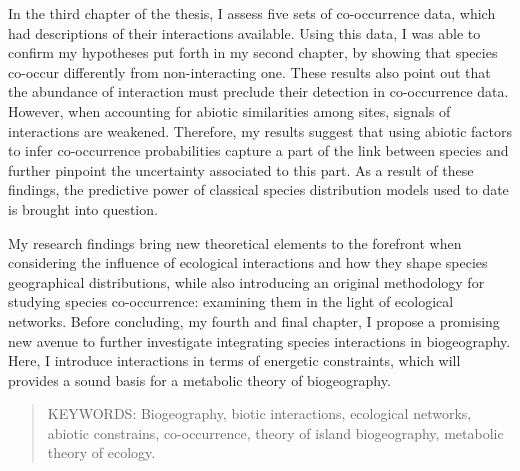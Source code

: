 In the third chapter of the thesis, I assess five sets of co-occurrence
data, which had descriptions of their interactions available. Using this
data, I was able to confirm my hypotheses put forth in my second
chapter, by showing that species co-occur differently from
non-interacting one. These results also point out that the abundance of
interaction must preclude their detection in co-occurrence data.
However, when accounting for abiotic similarities among sites, signals
of interactions are weakened. Therefore, my results suggest that using
abiotic factors to infer co-occurrence probabilities capture a part of
the link between species and further pinpoint the uncertainty associated
to this part. As a result of these findings, the predictive power of
classical species distribution models used to date is brought into
question.

My research findings bring new theoretical elements to the forefront
when considering the influence of ecological interactions and how they
shape species geographical distributions, while also introducing an
original methodology for studying species co-occurrence: examining them
in the light of ecological networks. Before concluding, my fourth and
final chapter, I propose a promising new avenue to further investigate
integrating species interactions in biogeography. Here, I introduce
interactions in terms of energetic constraints, which will provides a
sound basis for a metabolic theory of biogeography.

\begin{quote}
KEYWORDS: Biogeography, biotic interactions, ecological networks,
abiotic constrains, co-occurrence, theory of island biogeography,
metabolic theory of ecology.
\end{quote}
